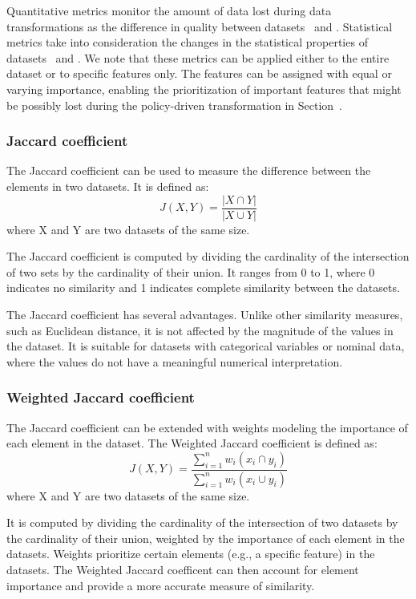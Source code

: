 Quantitative metrics monitor the amount of data lost during data transformations as the difference in quality between datasets \origdataset\ and \transdataset.
Statistical metrics take into consideration the changes in the statistical properties of datasets \origdataset\ and \transdataset. We note that these metrics can be applied either to the entire dataset or to specific features only. The features can be assigned with equal or varying importance, enabling the prioritization of important features that might be possibly lost during the policy-driven transformation in Section~\cite{ADD}.

\subsubsection{Jaccard coefficient}
The Jaccard coefficient can be used to measure the difference between the elements in two datasets.
It is defined as:\[J(X,Y) = \frac{|X \cap Y|}{|X \cup Y|}\]
where X and Y are two datasets of the same size.

The Jaccard coefficient is computed by dividing the cardinality of the intersection of two sets by the cardinality of their union. It ranges from 0 to 1, where 0 indicates no similarity and 1 indicates complete similarity between the datasets.

The Jaccard coefficient has several advantages. Unlike other similarity measures, such as Euclidean distance, it is not affected by the magnitude of the values in the dataset. It is suitable for datasets with categorical variables or nominal data, where the values do not have a meaningful numerical interpretation.

\subsubsection{Weighted Jaccard coefficient}
The Jaccard coefficient can be extended with weights modeling the importance of each element in the dataset.
The Weighted Jaccard coefficient is defined as:\[J(X,Y) = \frac{\sum_{i=1}^{n}w_i(x_i \cap y_i)}{\sum_{i=1}^{n}w_i(x_i \cup y_i)}\]
where X and Y are two datasets of the same size.

It is computed by dividing the cardinality of the intersection of two datasets by the cardinality of their union, weighted by the importance of each element in the datasets. Weights prioritize certain elements (e.g., a specific feature) in the datasets.
The Weighted Jaccard coefficent can then account for element importance and provide a more accurate measure of similarity.

